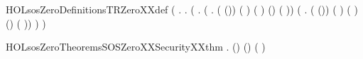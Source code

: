 \newcommand{\HOLsosZeroDate}{20 August 2016}
\newcommand{\HOLsosZeroTime}{12:51}
\begin{SaveVerbatim}{HOLsosZeroDefinitionsTRZeroXXdef}
\HOLTokenTurnstile{}  \HOLSymConst{=}
   (\HOLTokenLambda{}  .
      \HOLSymConst{\HOLTokenForall{}}.
        (\HOLSymConst{\HOLTokenForall{}}  .
           (\HOLSymConst{\HOLTokenExists{}}  .
              ( \HOLSymConst{=} (\HOLSymConst{,}\HOLSymConst{,})) \HOLSymConst{\HOLTokenConj{}} ( \HOLSymConst{=} ) \HOLSymConst{\HOLTokenConj{}} ( \HOLSymConst{=} ) \HOLSymConst{\HOLTokenConj{}}
              (\HOLSymConst{,}\HOLSymConst{,})   ( )) \HOLSymConst{\HOLTokenDisj{}}
           (\HOLSymConst{\HOLTokenExists{}}  .
              ( \HOLSymConst{=} (\HOLSymConst{,}\HOLSymConst{,})) \HOLSymConst{\HOLTokenConj{}} ( \HOLSymConst{=} ) \HOLSymConst{\HOLTokenConj{}} ( \HOLSymConst{=} ) \HOLSymConst{\HOLTokenConj{}}
              (\HOLSymConst{,}\HOLSymConst{,})   ( )) \HOLSymConst{\HOLTokenImp{}}
              ) \HOLSymConst{\HOLTokenImp{}}
           )
\end{SaveVerbatim}
\newcommand{\HOLsosZeroDefinitionsTRZeroXXdef}{\UseVerbatim{HOLsosZeroDefinitionsTRZeroXXdef}}
\newcommand{\HOLsosZeroDefinitions}{
\HOLDfnTag{sos0}{TR0_def}\HOLsosZeroDefinitionsTRZeroXXdef
}
\begin{SaveVerbatim}{HOLsosZeroTheoremsSOSZeroXXSecurityXXthm}
\HOLTokenTurnstile{} \HOLSymConst{\HOLTokenForall{}}    .
      (\HOLSymConst{,}\HOLSymConst{,})   \HOLSymConst{\HOLTokenImp{}} (\HOLSymConst{,}\HOLSymConst{,})   ( )
\end{SaveVerbatim}
